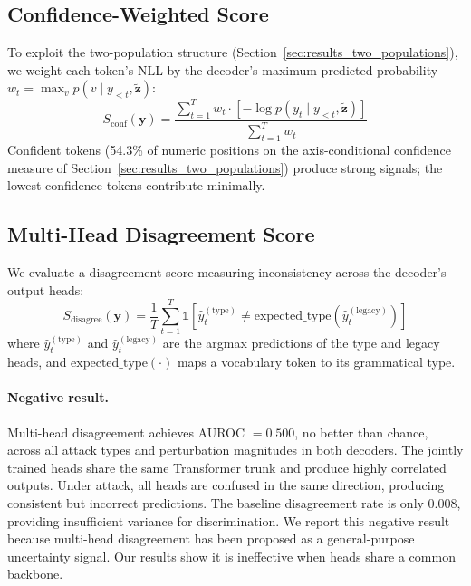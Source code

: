 \subsection{Confidence-Weighted Score}
\label{sec:confidence_score}

To exploit the two-population structure (Section~\ref{sec:results_two_populations}), we weight each token's NLL by the decoder's maximum predicted probability $w_t = \max_v p(v \mid y_{<t}, \tilde{\mathbf{z}})$:
\begin{equation}
    S_{\text{conf}}(\mathbf{y}) = \frac{\sum_{t=1}^{T} w_t \cdot \left[ -\log p(y_t \mid y_{<t}, \tilde{\mathbf{z}}) \right]}{\sum_{t=1}^{T} w_t}
    \label{eq:s_conf}
\end{equation}
Confident tokens (54.3\% of numeric positions on the axis-conditional confidence measure of Section~\ref{sec:results_two_populations}) produce strong signals; the lowest-confidence tokens contribute minimally.

\subsection{Multi-Head Disagreement Score}
\label{sec:disagreement_score}

We evaluate a disagreement score measuring inconsistency across the decoder's output heads:
\begin{equation}
    S_{\text{disagree}}(\mathbf{y}) = \frac{1}{T} \sum_{t=1}^{T} \mathbb{1}\left[ \hat{y}_t^{(\text{type})} \neq \text{expected\_type}(\hat{y}_t^{(\text{legacy})}) \right]
    \label{eq:s_disagree}
\end{equation}
where $\hat{y}_t^{(\text{type})}$ and $\hat{y}_t^{(\text{legacy})}$ are the argmax predictions of the type and legacy heads, and $\text{expected\_type}(\cdot)$ maps a vocabulary token to its grammatical type.

\paragraph{Negative result.}
Multi-head disagreement achieves AUROC $= 0.500$, no better than chance, across all attack types and perturbation magnitudes in both decoders.
The jointly trained heads share the same Transformer trunk and produce highly correlated outputs.
Under attack, all heads are confused in the same direction, producing consistent but incorrect predictions.
The baseline disagreement rate is only 0.008, providing insufficient variance for discrimination.
We report this negative result because multi-head disagreement has been proposed as a general-purpose uncertainty signal.
Our results show it is ineffective when heads share a common backbone.

